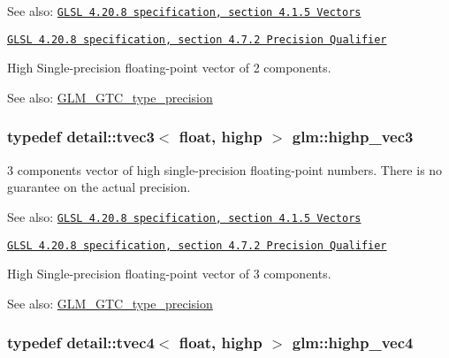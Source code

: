 \begin{Desc}
\item[See also:]\href{http://www.opengl.org/registry/doc/GLSLangSpec.4.20.8.pdf}{\tt GLSL 4.20.8 specification, section 4.1.5 Vectors} 

\href{http://www.opengl.org/registry/doc/GLSLangSpec.4.20.8.pdf}{\tt GLSL 4.20.8 specification, section 4.7.2 Precision Qualifier}\end{Desc}
High Single-precision floating-point vector of 2 components. \begin{Desc}
\item[See also:]\hyperlink{group__gtc__type__precision}{GLM\_\-GTC\_\-type\_\-precision} \end{Desc}
\hypertarget{group__core__precision_g4879124da7a18d6b681d933cb8c4267d}{
\subsubsection[highp\_\-vec3]{\setlength{\rightskip}{0pt plus 5cm}typedef detail::tvec3$<$ float, highp $>$ {\bf glm::highp\_\-vec3}}}
\label{group__core__precision_g4879124da7a18d6b681d933cb8c4267d}


3 components vector of high single-precision floating-point numbers. There is no guarantee on the actual precision.

\begin{Desc}
\item[See also:]\href{http://www.opengl.org/registry/doc/GLSLangSpec.4.20.8.pdf}{\tt GLSL 4.20.8 specification, section 4.1.5 Vectors} 

\href{http://www.opengl.org/registry/doc/GLSLangSpec.4.20.8.pdf}{\tt GLSL 4.20.8 specification, section 4.7.2 Precision Qualifier}\end{Desc}
High Single-precision floating-point vector of 3 components. \begin{Desc}
\item[See also:]\hyperlink{group__gtc__type__precision}{GLM\_\-GTC\_\-type\_\-precision} \end{Desc}
\hypertarget{group__core__precision_ge32d5f99860247afbe7ed90564bceac1}{
\subsubsection[highp\_\-vec4]{\setlength{\rightskip}{0pt plus 5cm}typedef detail::tvec4$<$ float, highp $>$ {\bf glm::highp\_\-vec4}}}
\label{group__core__precision_ge32d5f99860247afbe7ed90564bceac1}


